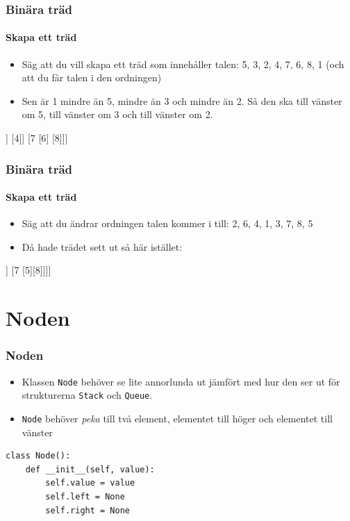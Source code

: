 \documentclass[aspectratio=169]{beamer}
\begin{document}
\begin{frame}
	\frametitle{Binära träd}
	\framesubtitle{Skapa ett träd}
	
	\begin{itemize}
		\item Säg att du vill skapa ett träd som innehåller talen: 5, 3, 2, 4, 7, 6, 8, 1 (och att du får talen i den ordningen)
		\item Sen är 1 mindre än 5, mindre än 3 och mindre än 2. Så den ska till vänster om 5, till vänster om 3 och till vänster om 2.
	\end{itemize}
	
	\centering
	\begin{forest}
		[5 [3 [2 [1]] [4]] [7 [6] [8]]]
	\end{forest}

\end{frame}

\begin{frame}
	\frametitle{Binära träd}
	\framesubtitle{Skapa ett träd}
	
	\begin{itemize}
		\item Säg att du ändrar ordningen talen kommer i till: 2, 6, 4, 1, 3, 7, 8, 5 
		\item Då hade trädet sett ut så här istället:
	\end{itemize}
	
	\centering
	\begin{forest}
		[2 [1] [6 [4 [3]] [7 [5][8]]]]
	\end{forest}

\end{frame}

\section{Noden}

\begin{frame}[fragile]
	\frametitle{Noden}

	\begin{itemize}
		\item Klassen \texttt{Node} behöver se lite annorlunda ut jämfört med hur den ser ut för strukturerna \texttt{Stack} och \texttt{Queue}.
		\item \texttt{Node} behöver \textit{peka} till två element, elementet till höger och elementet till vänster
	\end{itemize}
	
	\begin{lstlisting}
class Node():
    def __init__(self, value):
        self.value = value
        self.left = None
        self.right = None
	\end{lstlisting}
	
\end{frame}
\end{document}
